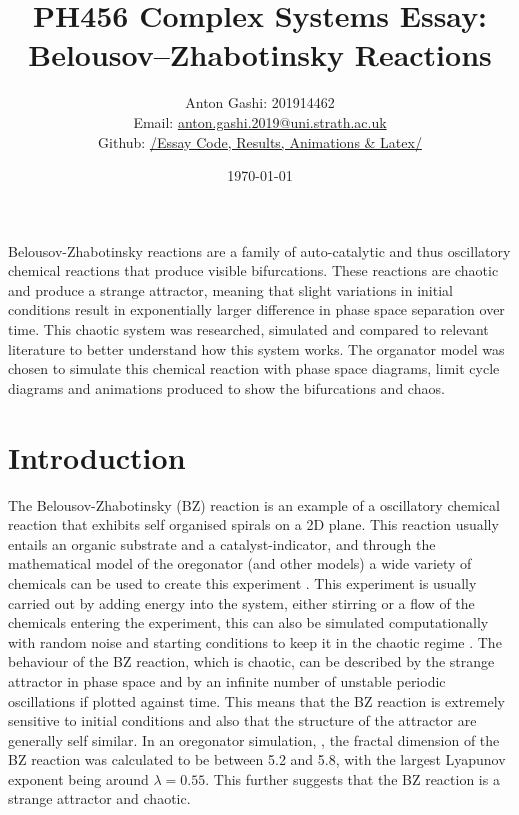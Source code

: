 \documentclass[12pt, A4]{article}
\title{PH456 Complex Systems Essay: Belousov–Zhabotinsky Reactions}
\author{Anton Gashi: 201914462 \\ Email: \href{anton.gashi.2019@uni.strath.ac.uk}{anton.gashi.2019@uni.strath.ac.uk} \\ Github: \href{https://github.com/AntonGashi/Computation_Class}{/Essay Code, Results, Animations \& Latex/}}
\date{\today}
\begin{document}
\begin{titlepage}
\clearpage\maketitle
\thispagestyle{empty}
\end{titlepage}

\abstract

Belousov-Zhabotinsky reactions are a family of auto-catalytic and thus oscillatory chemical 
reactions that produce visible bifurcations. These reactions are chaotic and produce a strange 
attractor, meaning that slight variations in initial conditions result in exponentially larger difference 
in phase space separation over time. This chaotic system was researched, simulated and compared to 
relevant literature to better understand how this system works. The organator model was chosen to 
simulate this chemical reaction with phase space diagrams, limit cycle diagrams and animations 
produced to show the bifurcations and chaos.

\section{Introduction} %
\label{sec:Introduction}

The Belousov-Zhabotinsky (BZ) reaction is an example of a oscillatory chemical 
reaction that exhibits self organised spirals on a 2D plane. 
This reaction usually entails an organic substrate and a catalyst-indicator, 
and through the mathematical model of the oregonator (and other models) a wide variety of chemicals 
can be used to create this experiment \cite{chen2000mathematical}.
This experiment is usually carried out by adding energy into the system, either 
stirring or a flow of the chemicals entering the experiment, this can also 
be simulated computationally with random noise and starting conditions to keep it in the 
chaotic regime \cite{petrov1993controlling}.
The behaviour of the BZ reaction, which is chaotic, can be described by 
the strange attractor in phase space and by an infinite number of 
unstable periodic oscillations if plotted against time. This means that the 
BZ reaction is extremely sensitive to initial conditions and also that the structure of 
the attractor are generally self similar. In an oregonator simulation, \cite{mukesh1993modelling}, 
the fractal dimension of the BZ reaction was calculated to be between 5.2 and 5.8, with 
the largest Lyapunov exponent being around $\lambda = 0.55$. This further suggests that 
the BZ reaction is a strange attractor and chaotic.
\end{document}
